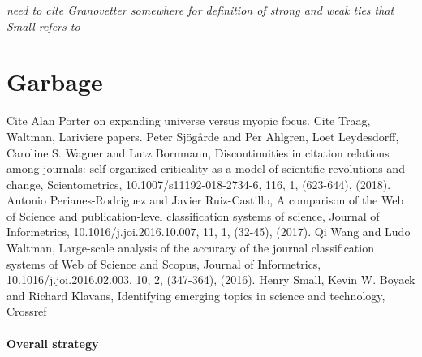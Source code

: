 \emph{need to cite Granovetter somewhere for definition of strong and weak ties that Small refers to}




%
%




\clearpage



\section{Garbage}

Cite Alan Porter on expanding universe versus myopic focus. Cite Traag, Waltman, Lariviere papers. Peter Sjögårde and Per Ahlgren, Loet Leydesdorff, Caroline S. Wagner and Lutz Bornmann, Discontinuities in citation relations among journals: self-organized criticality as a model of scientific revolutions and change, Scientometrics, 10.1007/s11192-018-2734-6, 116, 1, (623-644), (2018). Antonio Perianes-Rodriguez and Javier Ruiz-Castillo, A comparison of the Web of Science and publication-level classification systems of science, Journal of Informetrics, 10.1016/j.joi.2016.10.007, 11, 1, (32-45), (2017). Qi Wang and Ludo Waltman, Large-scale analysis of the accuracy of the journal classification systems of Web of Science and Scopus, Journal of Informetrics, 10.1016/j.joi.2016.02.003, 10, 2, (347-364), (2016). Henry Small, Kevin W. Boyack and Richard Klavans, Identifying emerging topics in science and technology, 
Crossref




\paragraph{Overall strategy}

